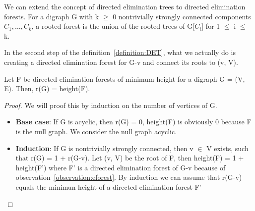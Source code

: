 We can extend the concept of directed elimination trees to directed elimination forests. For a digraph G with k $\geq$ 0 nontrivially strongly connected components $C_1, \ldots, C_k$, a rooted forest is the union of the rooted trees of G[$C_i$] for 1 $\leq$ i $\leq$ k.

\begin{observation}
In the second step of the definition~\ref{definition:DET}, what we actually do is creating a directed elimination forest for G-v and connect its roots to (v, V).
\label{observation:eforest}
\end{observation}

\begin{lemma}
Let F be directed elimination forests of minimum height for a digraph G = (V, E). Then, r(G) = height(F). 
\end{lemma}
\begin{proof}
We will proof this by induction on the number of vertices of G.
\begin{itemize}
  \item \textbf{Base case}: If G is acyclic, then r(G) = 0, height(F) is obviously 0 because F is the null graph. We consider the null graph acyclic.
  \item \textbf{Induction}: If G is nontrivially strongly connected, then v $\in$ V exists, such that r(G) = 1 + r(G-v). Let (v, V) be the root of F, then height(F) = 1 + height(F') where F' is a directed elimination forest of G-v because of observation~\ref{observation:eforest}. By induction we can assume that r(G-v) equals the minimun height of a directed elimination forest F'
\end{itemize}
\end{proof}